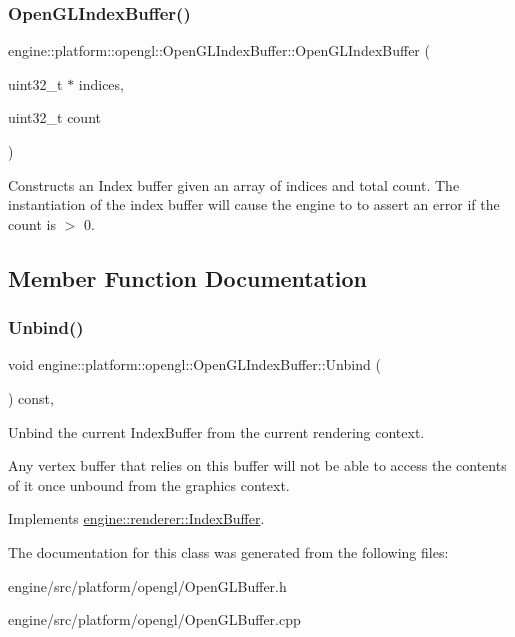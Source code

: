 \subsubsection{\texorpdfstring{Open\+G\+L\+Index\+Buffer()}{OpenGLIndexBuffer()}}
{\footnotesize\ttfamily engine\+::platform\+::opengl\+::\+Open\+G\+L\+Index\+Buffer\+::\+Open\+G\+L\+Index\+Buffer (\begin{DoxyParamCaption}\item[{uint32\+\_\+t $\ast$}]{indices,  }\item[{uint32\+\_\+t}]{count }\end{DoxyParamCaption})}

Constructs an Index buffer given an array of indices and total count. The instantiation of the index buffer will cause the engine to to assert an error if the count is $>$ 0. 

\subsection{Member Function Documentation}
\mbox{\label{classengine_1_1platform_1_1opengl_1_1OpenGLIndexBuffer_a9fc400e4c464a2dbf7df76eba359639e}} 
\subsubsection{\texorpdfstring{Unbind()}{Unbind()}}
{\footnotesize\ttfamily void engine\+::platform\+::opengl\+::\+Open\+G\+L\+Index\+Buffer\+::\+Unbind (\begin{DoxyParamCaption}{ }\end{DoxyParamCaption}) const\hspace{0.3cm}{\ttfamily [override]}, {\ttfamily [virtual]}}



Unbind the current Index\+Buffer from the current rendering context. 

Any vertex buffer that relies on this buffer will not be able to access the contents of it once unbound from the graphics context. 

Implements \hyperlink{classengine_1_1renderer_1_1IndexBuffer_a8fd1ab43d3963533370c4d8e2e2282f4}{engine\+::renderer\+::\+Index\+Buffer}.



The documentation for this class was generated from the following files\+:\begin{DoxyCompactItemize}
\item 
engine/src/platform/opengl/Open\+G\+L\+Buffer.\+h\item 
engine/src/platform/opengl/Open\+G\+L\+Buffer.\+cpp\end{DoxyCompactItemize}
